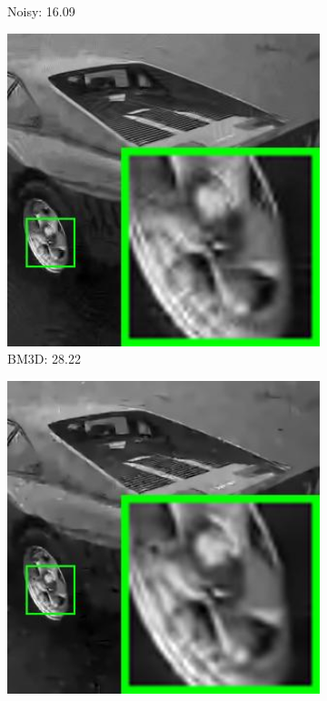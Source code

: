 \begin{figure}
\begin{subfigure}[t]{0.24\textwidth}
		\caption{Noisy: 16.09}
    \end{subfigure}
    \hfill
    \begin{subfigure}[t]{0.24\textwidth}
        \centering
        \includegraphics[width=1\textwidth]{images/pgpd/200img/br_BM3D_40_29030.jpg}
		\caption{BM3D: 28.22}
    \end{subfigure}
    \hfill
    \begin{subfigure}[t]{0.24\textwidth}
        \centering
        \includegraphics[width=1\textwidth]{images/pgpd/200img/br_EPLL_40_29030.jpg}

\end{subfigure}
\end{figure}
